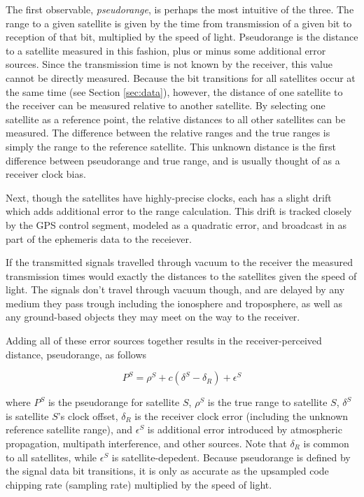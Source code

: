 \documentclass[12pt]{article}
\begin{document}
The first observable, \emph{pseudorange}, is perhaps the most intuitive of the three. The range to a given satellite is given by the time from transmission of a given bit to reception of that bit, multiplied by the speed of light. Pseudorange is the distance to a satellite measured in this fashion, plus or minus some additional error sources. Since the transmission time is not known by the receiver, this value cannot be directly measured. Because the bit transitions for all satellites occur at the same time (see Section \ref{sec:data}), however, the distance of one satellite to the receiver can be measured relative to another satellite. By selecting one satellite as a reference point, the relative distances to all other satellites can be measured. The difference between the relative ranges and the true ranges is simply the range to the reference satellite. This unknown distance is the first difference between pseudorange and true range, and is usually thought of as a receiver clock bias.

Next, though the satellites have highly-precise clocks, each has a slight drift which adds additional error to the range calculation. This drift is tracked closely by the GPS control segment, modeled as a quadratic error, and broadcast in as part of the ephemeris data to the receiever.

If the transmitted signals travelled through vacuum to the receiver the measured transmission times would exactly the distances to the satellites given the speed of light. The signals don't travel through vacuum though, and are delayed by any medium they pass trough including the ionosphere and troposphere, as well as any ground-based objects they may meet on the way to the receiver.

Adding all of these error sources together results in the receiver-perceived distance, pseudorange, as follows

\begin{equation}
\label{eqn:pseudorange}
P^S=\rho^S+c(\delta^S-\delta_R)+\epsilon^S
\end{equation}

where $P^S$ is the pseudorange for satellite $S$, $\rho^S$ is the true range to satellite $S$, $\delta^S$ is satellite $S$'s clock offset, $\delta_R$ is the receiver clock error (including the unknown reference satellite range), and $\epsilon^S$ is additional error introduced by atmospheric propagation, multipath interference, and other sources. Note that $\delta_R$ is common to all satellites, while $\epsilon^S$ is satellite-depedent. Because pseudorange is defined by the signal data bit transitions, it is only as accurate as the upsampled code chipping rate (sampling rate) multiplied by the speed of light.
\end{document}
